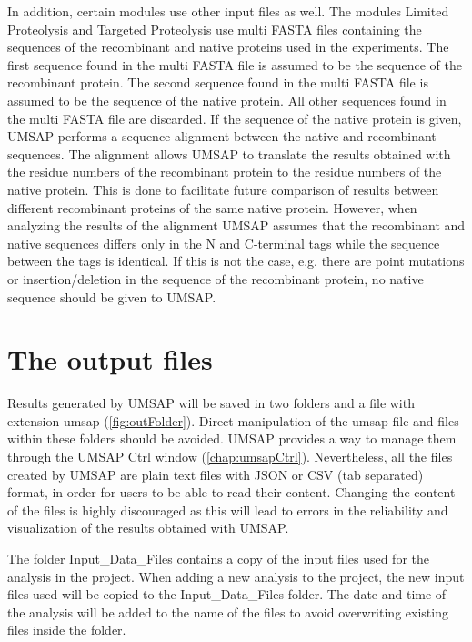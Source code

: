 In addition, certain modules use other input files as well. The modules Limited Proteolysis
and Targeted Proteolysis use multi FASTA files containing the sequences of
the recombinant and native proteins used in the experiments. The first sequence
found in the multi FASTA file is assumed to be the sequence of the recombinant protein.
The second sequence found in the multi FASTA file is assumed to be the sequence of the
native protein. All other sequences found in the multi FASTA file are discarded. If the
sequence of the native protein is given, UMSAP performs a sequence alignment between
the native and recombinant sequences. The alignment allows UMSAP to translate the
results obtained with the residue numbers of the recombinant protein to the residue
numbers of the native protein. This is done to facilitate future comparison of results
between different recombinant proteins of the same native protein. However, when
analyzing the results of the alignment UMSAP assumes that the recombinant and native
sequences differs only in the N and C-terminal tags while the sequence between the
tags is identical. If this is not the case, e.g. there are point mutations or
insertion/deletion in the sequence of the recombinant protein, no native sequence
should be given to UMSAP.

\section{The output files}
\label{sec:outFile}

Results generated by UMSAP will be saved in two folders and a file with extension
umsap (\autoref{fig:outFolder}). Direct manipulation of the umsap file and files
within these folders should be avoided. UMSAP provides a way to manage them through
the UMSAP Ctrl window (\autoref{chap:umsapCtrl}). Nevertheless, all the files created
by UMSAP are plain text files with JSON or CSV (tab separated) format, in order for
users to be able to read their content. Changing the content of the files is highly
discouraged as this will lead to errors in the reliability and visualization of the
results obtained with UMSAP.

The folder Input{\_}Data{\_}Files contains a copy of the input files used for the analysis
in the project. When adding a new analysis to the project, the new input files used
will be copied to the Input{\_}Data{\_}Files folder. The date and time of the analysis will
be added to the name of the files to avoid overwriting existing files inside the folder.

